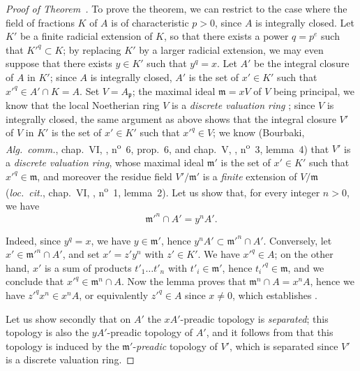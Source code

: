 \begin{proof}[Proof of Theorem~{\rm{}}]
To prove the theorem, we can restrict to the case where the field of fractions $K$ of $A$ is of characteristic $p>0$, since $A$ is integrally closed.
Let $K'$ be a finite radicial extension of $K$, so that there exists a power $q=p^e$ such that $K'^q\subset K$; by replacing $K'$ by a larger radicial extension, we may even suppose that there exists $y\in K'$ such that $y^q=x$.
Let $A'$ be the integral closure of $A$ in $K'$; since $A$ is integrally closed, $A'$ is the set of $x'\in K'$ such that $x'^q\in A'\cap K=A$.
Set $V=A_\mathfrak{p}$; the maximal ideal $\mathfrak{m}=xV$ of $V$ being principal, we know that the local Noetherian ring $V$ is a \emph{discrete valuation ring} ; since $V$ is integrally closed, the same
argument as above shows that the integral closure $V'$ of $V$ in $K'$ is the set of $x'\in K'$ such that $x'^q\in V$; we know (Bourbaki, \emph{Alg.~comm.}, chap.~VI, , n\textsuperscript{o}~6, prop.~6, and chap.~V, , n\textsuperscript{o}~3, lemma~4) that $V'$ is a \emph{discrete valuation ring}, whose maximal ideal $\mathfrak{m}'$ is the set of $x'\in K'$ such that $x'^q\in\mathfrak{m}$, and moreover the residue field $V'/\mathfrak{m}'$ is a \emph{finite} extension of $V/\mathfrak{m}$ (\emph{loc.~cit.}, chap.~VI, , n\textsuperscript{o}~1, lemma~2).
Let us show that, for every integer $n>0$, we have
\[
\label{0.23.1.3.2}
  \mathfrak{m}'^n\cap A'=y^nA'.
  \tag{23.1.3.2}
\]

Indeed, since $y^q=x$, we have $y\in\mathfrak{m}'$, hence $y^nA'\subset\mathfrak{m}'^n\cap A'$.
Conversely, let $x'\in\mathfrak{m}'^n\cap A'$, and set $x'=z'y^n$ with $z'\in K'$.
We have $x'^q\in A$; on the other hand, $x'$ is a sum of products $t'_1\ldots t'_n$ with $t'_i\in\mathfrak{m}'$, hence $t_i'^q\in\mathfrak{m}$, and we conclude that $x'^q\in\mathfrak{m}^n\cap A$.
Now the lemma  proves that $\mathfrak{m}^n\cap A=x^nA$, hence we have $z'^qx^n\in x^nA$, or equivalently $z'^q\in A$ since $x\neq 0$, which establishes .

Let us show secondly that on $A'$ the $xA'$-preadic topology is \emph{separated}; this topology is also the $yA'$-preadic topology of $A'$, and it follows from  that this topology is induced by the $\mathfrak{m}'$-\emph{preadic} topology of $V'$, which is separated since $V'$ is a discrete valuation ring.


\end{proof}
